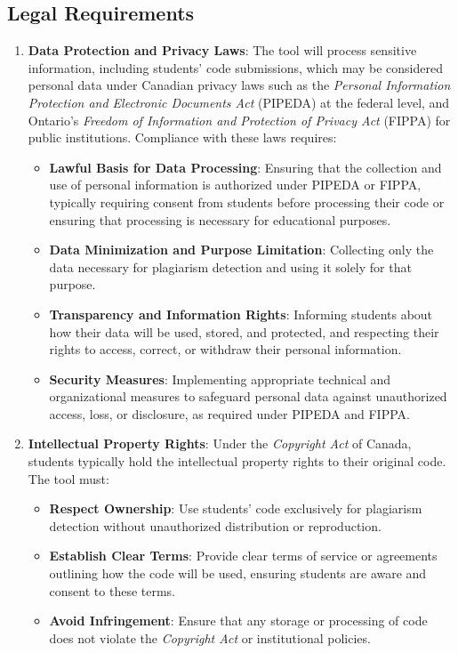 \documentclass[12pt]{article}
\begin{document}
\subsection{Legal Requirements}

\begin{enumerate}
    \item \textbf{Data Protection and Privacy Laws}: The tool will process sensitive
    information, including students' code submissions, which may be considered personal
    data under Canadian privacy laws such as the \textit{Personal Information Protection 
    and Electronic Documents Act} (PIPEDA) at the federal level, and Ontario's \textit{Freedom of 
    Information and Protection of Privacy Act} (FIPPA) for public institutions. Compliance with these 
    laws requires:
    \begin{itemize}
        \item \textbf{Lawful Basis for Data Processing}: Ensuring that the collection and use of 
        personal information is authorized under PIPEDA or FIPPA, typically requiring consent from 
        students before processing their code or ensuring that processing is necessary for educational purposes.
        \item \textbf{Data Minimization and Purpose Limitation}: Collecting only the data
        necessary for plagiarism detection and using it solely for that purpose.
        \item \textbf{Transparency and Information Rights}: Informing students about how
        their data will be used, stored, and protected, and respecting their rights to
        access, correct, or withdraw their personal information.
        \item \textbf{Security Measures}: Implementing appropriate technical and
        organizational measures to safeguard personal data against unauthorized access,
        loss, or disclosure, as required under PIPEDA and FIPPA.
    \end{itemize}

    \item \textbf{Intellectual Property Rights}: Under the \textit{Copyright Act} of Canada, 
    students typically hold the intellectual property rights to their original code. 
    The tool must:
    \begin{itemize}
        \item \textbf{Respect Ownership}: Use students' code exclusively for plagiarism
        detection without unauthorized distribution or reproduction.
        \item \textbf{Establish Clear Terms}: Provide clear terms of service or agreements
        outlining how the code will be used, ensuring students are aware and consent to
        these terms.
        \item \textbf{Avoid Infringement}: Ensure that any storage or processing of code
        does not violate the \textit{Copyright Act} or institutional policies.
    \end{itemize}


\end{enumerate}
\end{document}
